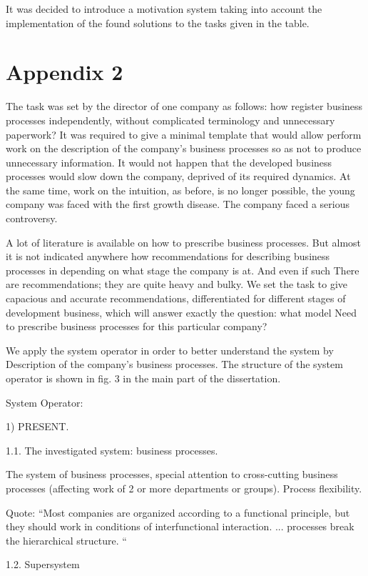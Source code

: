 \documentclass[11pt,a4paper]{book}
\begin{document}
It was decided to introduce a motivation system taking into account the
implementation of the found solutions to the tasks given in the table.

\chapter{Appendix 2}

The task was set by the director of one company as follows: how register
business processes independently, without complicated terminology and
unnecessary paperwork? It was required to give a minimal template that would
allow perform work on the description of the company's business processes so
as not to produce unnecessary information. It would not happen that the
developed business processes would slow down the company, deprived of its
required dynamics. At the same time, work on the intuition, as before, is no
longer possible, the young company was faced with the first growth
disease. The company faced a serious controversy.

A lot of literature is available on how to prescribe business processes. But
almost it is not indicated anywhere how recommendations for describing
business processes in depending on what stage the company is at. And even if
such There are recommendations; they are quite heavy and bulky. We set the
task to give capacious and accurate recommendations, differentiated for
different stages of development business, which will answer exactly the
question: what model Need to prescribe business processes for this particular
company?

We apply the system operator in order to better understand the system by
Description of the company's business processes. The structure of the system
operator is shown in fig. 3 in the main part of the dissertation.

System Operator:

1) PRESENT.

1.1. The investigated system: business processes.

The system of business processes, special attention to cross-cutting business
processes (affecting work of 2 or more departments or groups). Process
flexibility.

Quote: “Most companies are organized according to a functional principle, but
they should work in conditions of interfunctional interaction. ... processes
break the hierarchical structure. “

1.2. Supersystem
\end{document}
